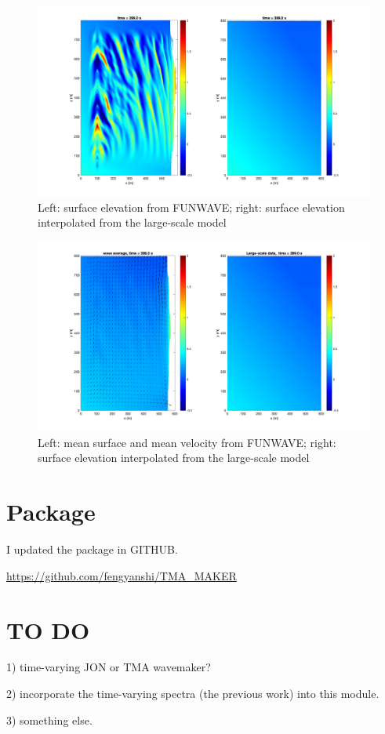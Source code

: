\documentclass[preprint,10pt]{elsarticle}
\begin{document}
 \begin{figure}
\begin{center}
 \includegraphics[width=1.0\textwidth]{figures/elevation_view.jpg}
 \caption{Left: surface elevation from FUNWAVE; right: surface elevation interpolated from the large-scale model }
 \label{surface}
 \end{center}
 \end{figure}  
  
  \begin{figure}
\begin{center}
 \includegraphics[width=1.0\textwidth]{figures/uvmean_view.jpg}
 \caption{Left: mean surface and mean velocity from FUNWAVE; right: surface elevation interpolated from the large-scale model }
 \label{mean}
 \end{center}
 \end{figure}  
  
  \section{Package}
  
  I updated the package in GITHUB. 
  
    \href{https://github.com/fengyanshi/TMA_MAKER}{https://github.com/fengyanshi/TMA\_MAKER}
  
  \section{TO DO}
  
  1) time-varying JON or TMA wavemaker?
  
  2) incorporate the time-varying spectra (the previous work) into this module. 
  
  3) something else.
  
\end{document}
